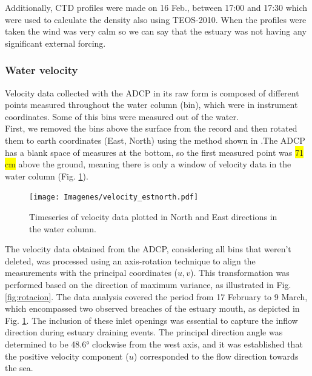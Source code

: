 \documentclass[tesis.tex]{subfiles}
\begin{document}
Additionally, CTD profiles were made on 16 Feb., between 17:00 and 17:30 which were used to calculate the density also using TEOS-2010. When the profiles were taken the wind was very calm so we can say that the estuary was not having any significant external forcing. \\

\subsubsection{Water velocity} \label{Estuary_currents}

Velocity data collected with the ADCP in its raw form is composed of different points measured throughout the water column (bin), which were in instrument coordinates. Some of this bins were measured out of the water.\\

First, we removed the bins above the surface from the record and then rotated them to earth coordinates (East, North) using the method shown in \cite{teledyne2008}.The ADCP has a blank space of measures at the bottom, so the first measured point was \colorbox{yellow}{71 cm} above the ground, meaning there is only a window of velocity data in the water column (Fig. \ref{fig:north_east}).\\

\begin{figure}[h!]
    \centering
    \texttt{[image: Imagenes/velocity\_estnorth.pdf]}
    \caption{Timeseries of velocity data plotted in North and East directions in the water column.}
    \label{fig:north_east}
\end{figure}

The velocity data obtained from the ADCP, considering all bins that weren't deleted, was processed using an axis-rotation technique to align the measurements with the principal coordinates ($u,v$). This transformation was performed based on the direction of maximum variance, as illustrated in Fig. \ref{fig:rotacion}. The data analysis covered the period from 17 February to 9 March, which encompassed two observed breaches of the estuary mouth, as depicted in Fig. \ref{fig:north_east}. The inclusion of these inlet openings was essential to capture the inflow direction during estuary draining events. The principal direction angle was determined to be 48.6° clockwise from the west axis, and it was established that the positive velocity component ($u$) corresponded to the flow direction towards the sea.\\
\end{document}
